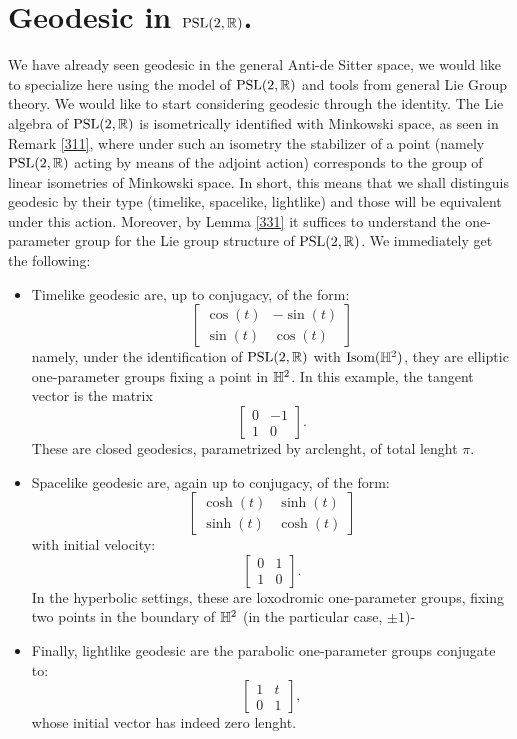 \section{Geodesic in $\text{PSL}(2,\mathbb{R})$.} We have already seen geodesic in the general Anti-de Sitter space, we would like to specialize here using the model of $\text{PSL}(2,\mathbb{R})$ and tools from general Lie Group theory.  We would like to start considering geodesic through the identity. The Lie algebra of $\text{PSL}(2,\mathbb{R})$ is isometrically identified with Minkowski space, as seen in Remark \ref{311}, where under such an isometry the stabilizer of a point (namely $\text{PSL}(2,\mathbb{R})$ acting by means of the adjoint action) corresponds to the group of linear isometries of Minkowski space. In short, this means that we shall distinguis geodesic by their type (timelike, spacelike, lightlike) and those will be equivalent under this action. Moreover, by Lemma \ref{331} it suffices to understand the one-parameter group for the Lie group structure of $\text{PSL}(2,\mathbb{R})$. We immediately get the following:

\begin{itemize}
    \item Timelike geodesic are, up to conjugacy, of the form: 
    \[
    \begin{bmatrix}
    \cos(t) & -\sin(t) \\
    \sin(t) & \cos(t)
     \end{bmatrix}
\]
namely, under the identification of $\text{PSL}(2,\mathbb{R})$ with $\text{Isom}(\mathbb{H}^2)$, they are elliptic one-parameter groups fixing a point in $\mathbb{H}^2$. In this example, the tangent vector is the matrix
\[
    \begin{bmatrix}
    0 & -1 \\
    1 & 0
    \end{bmatrix}.
    \]
These are closed geodesics, parametrized by arclenght, of total lenght $\pi$. 
\item Spacelike geodesic are, again up to conjugacy, of the form: 
\[
    \begin{bmatrix}
    \cosh(t) & \sinh(t) \\
    \sinh(t) & \cosh(t) \end{bmatrix}
\]
with initial velocity: 
\[
    \begin{bmatrix}
        0 & 1 \\
        1 & 0
    \end{bmatrix}.
\]
In the hyperbolic settings, these are loxodromic one-parameter groups, fixing two points in the boundary of $\mathbb{H}^2$ (in the particular case, $\pm 1$)-
\item Finally, lightlike geodesic are the parabolic one-parameter groups conjugate to: 
\[
    \begin{bmatrix}
        1 & t \\
        0 & 1 
    \end{bmatrix},
\]
whose initial vector has indeed zero lenght.
\end{itemize}

